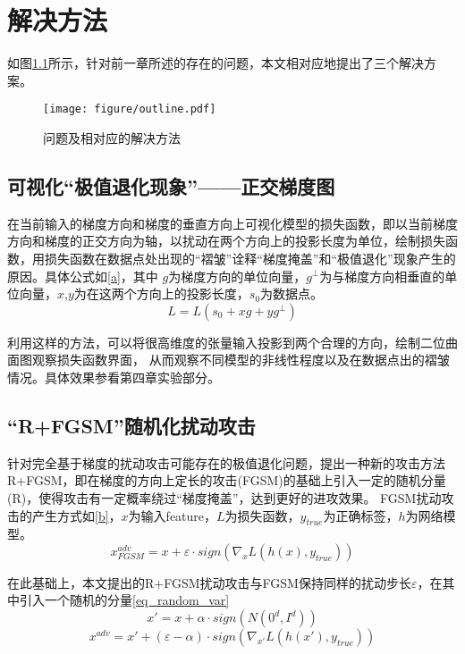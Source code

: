 \chapter{解决方法}

如图\ref{fig:outline}所示，针对前一章所述的存在的问题，本文相对应地提出了三个解决方案。

\begin{figure}[htbp]
    \centering
    \texttt{[image: figure/outline.pdf]}
    \caption{问题及相对应的解决方法}
    \label{fig:outline}
\end{figure}

\section{可视化“极值退化现象”——正交梯度图}
在当前输入的梯度方向和梯度的垂直方向上可视化模型的损失函数，即以当前梯度方向和梯度的正交方向为轴，以扰动在两个方向上的投影长度为单位，绘制损失函数，用损失函数在数据点处出现的“褶皱”诠释“梯度掩盖”和“极值退化”现象产生的原因。具体公式如\eqref{a}，其中 $g$为梯度方向的单位向量，$g^{\bot}$为与梯度方向相垂直的单位向量，$x$,$y$为在这两个方向上的投影长度，$s_0$为数据点。
\begin{equation}
L = L(s_0 + xg + yg^{\bot})
\label{a}
\end{equation}

利用这样的方法，可以将很高维度的张量输入投影到两个合理的方向，绘制二位曲面图观察损失函数界面，
从而观察不同模型的非线性程度以及在数据点出的褶皱情况。具体效果参看第四章实验部分。



\section{“R+FGSM”随机化扰动攻击}
针对完全基于梯度的扰动攻击可能存在的极值退化问题，提出一种新的攻击方法R+FGSM，即在梯度的方向上定长的攻击(FGSM)的基础上引入一定的随机分量(R)，使得攻击有一定概率绕过“梯度掩盖”，达到更好的进攻效果。
FGSM扰动攻击的产生方式如\eqref{b}，$x$为输入feature，$L$为损失函数，$y_{true}$为正确标签，$h$为网络模型。
\begin{equation}
x_{FGSM}^{adv} = x + \varepsilon \cdot sign(\nabla_x L(h(x), y_{true}))  
\label{b}
\end{equation}

在此基础上，本文提出的R+FGSM扰动攻击与FGSM保持同样的扰动步长$\varepsilon$，在其中引入一个随机的分量\eqref{eq_random_var}
\begin{equation}
x' = x + \alpha \cdot sign(N(0^d, I^d))
\label{eq_random_var}
\end{equation}
\begin{equation}
x^{adv} = x' + (\varepsilon - \alpha) \cdot sign(\nabla_{x'} L(h(x'), y_{true}))  
\label{R_FGSM}
\end{equation}


